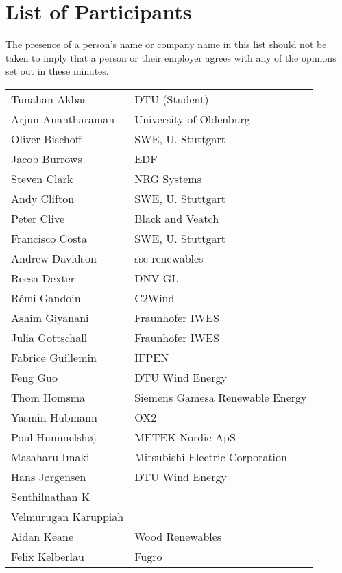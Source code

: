 \section*{List of Participants}

The presence of a person's name or company name in this list should not be taken to imply that a person or their employer agrees with any of the opinions set out in these minutes.

\begin{supertabular}{@{}|p{0.45\columnwidth}|p{0.55\columnwidth}|@{}}
Tunahan Akbas & DTU (Student) \\
Arjun Anantharaman & University of Oldenburg \\
Oliver Bischoff & SWE, U. Stuttgart \\
 Jacob Burrows & EDF \\
 Steven Clark & NRG Systems \\
 Andy Clifton & SWE, U. Stuttgart \\
 Peter Clive & Black and Veatch \\
 Francisco Costa & SWE, U. Stuttgart \\
 Andrew Davidson & sse renewables \\
 Reesa Dexter & DNV GL \\
 Rémi Gandoin & C2Wind \\
 Ashim Giyanani & Fraunhofer IWES \\
 Julia Gottschall & Fraunhofer IWES \\
 Fabrice Guillemin & IFPEN \\
 Feng Guo & DTU Wind Energy \\
 Thom Homsma & Siemens Gamesa Renewable Energy \\
 Yasmin Hubmann & OX2\\
 Poul Hummelshøj & METEK Nordic ApS \\
 Masaharu Imaki & Mitsubishi Electric Corporation \\
 Hans Jørgensen & DTU Wind Energy \\
 Senthilnathan K & \\
 Velmurugan Karuppiah & \\
 Aidan Keane & Wood Renewables \\
 Felix Kelberlau & Fugro \\

\end{supertabular}
